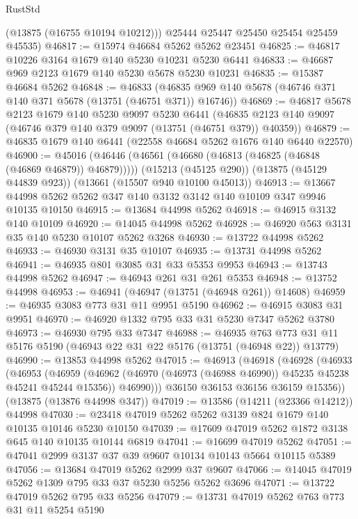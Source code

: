 \begin{lexlean}{RustStd}
\begin{coremodule}
        (@13875 (@16755 @10194 @10212)))
      @25444
      @25447
      @25450
      @25454
      @25459
      @45535)
@46817 := @15974 @46684 @5262 @5262 @23451
@46825 := @46817 @10226 @3164 @1679 @140 @5230 @10231 @5230 @6441
@46833 := @46687 @969 @2123 @1679 @140 @5230 @5678 @5230 @10231
@46835 := @15387 @46684 @5262
@46848 := @46833
    (@46835 @969 @140 @5678 (@46746 @371 @140 @371 @5678 (@13751 (@46751 @371)) @16746))
@46869 := @46817
    @5678
    @2123
    @1679
    @140
    @5230
    @9097
    @5230
    @6441
    (@46835 @2123 @140 @9097 (@46746 @379 @140 @379 @9097 (@13751 (@46751 @379)) @40359))
@46879 := @46835 @1679 @140 @6441 (@22558 @46684 @5262 @1676 @140 @6440 @22570)
@46900 := @45016
    (@46446 (@46561 (@46680 (@46813 (@46825 (@46848 (@46869 @46879)) @46879)))))
    (@15213 (@45125 @290))
    (@13875 (@45129 @44839 @923))
    (@13661 (@15507 @940 @10100 @45013))
@46913 := @13667 @44998 @5262 @5262 @347 @140 @3132 @3142 @140 @10109 @347 @9946 @10135 @10150
@46915 := @13684 @44998 @5262
@46918 := @46915 @3132 @140 @10109
@46920 := @14045 @44998 @5262
@46928 := @46920 @563 @3131 @35 @140 @5230 @10107 @5262 @3268
@46930 := @13722 @44998 @5262
@46933 := @46930 @3131 @35 @10107
@46935 := @13731 @44998 @5262
@46941 := @46935 @801 @3085 @31 @33 @5353 @9953
@46943 := @13743 @44998 @5262
@46947 := @46943 @261 @31 @261 @5353
@46948 := @13752 @44998
@46953 := @46941 (@46947 (@13751 (@46948 @261)) @14608)
@46959 := @46935 @3083 @773 @31 @11 @9951 @5190
@46962 := @46915 @3083 @31 @9951
@46970 := @46920 @1332 @795 @33 @31 @5230 @7347 @5262 @3780
@46973 := @46930 @795 @33 @7347
@46988 := @46935
    @763
    @773
    @31
    @11
    @5176
    @5190
    (@46943 @22 @31 @22 @5176 (@13751 (@46948 @22)) @13779)
@46990 := @13853 @44998 @5262
@47015 := @46913
    (@46918
      (@46928
        (@46933
          (@46953
            (@46959
              (@46962 (@46970 (@46973 (@46988 @46990)) @45235 @45238 @45241 @45244 @15356))
              @46990)))
        @36150
        @36153
        @36156
        @36159
        @15356))
    (@13875 (@13876 @44998 @347))
@47019 := @13586 (@14211 (@23366 @14212)) @44998
@47030 := @23418 @47019 @5262 @5262 @3139 @824 @1679 @140 @10135 @10146 @5230 @10150
@47039 := @17609 @47019 @5262 @1872 @3138 @645 @140 @10135 @10144 @6819
@47041 := @16699 @47019 @5262
@47051 := @47041 @2999 @3137 @37 @39 @9607 @10134 @10143 @5664 @10115 @5389
@47056 := @13684 @47019 @5262 @2999 @37 @9607
@47066 := @14045 @47019 @5262 @1309 @795 @33 @37 @5230 @5256 @5262 @3696
@47071 := @13722 @47019 @5262 @795 @33 @5256
@47079 := @13731 @47019 @5262 @763 @773 @31 @11 @5254 @5190

\end{coremodule}
\end{lexlean}
